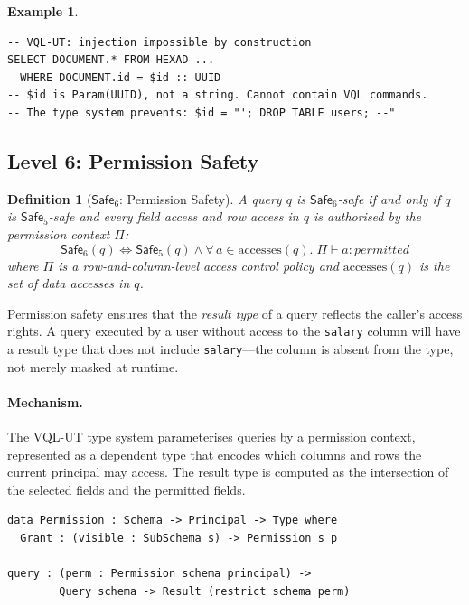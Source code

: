 \documentclass[11pt,a4paper]{article}
\newtheorem{definition}[theorem]{Definition}
\newtheorem{example}[theorem]{Example}
\newcommand{\VQL}{\textsc{VQL-UT}}
\newcommand{\Safe}[1]{\ensuremath{\mathsf{Safe}_{#1}}}
\begin{document}
\begin{example}
\begin{lstlisting}[language=VQL]
-- VQL-UT: injection impossible by construction
SELECT DOCUMENT.* FROM HEXAD ...
  WHERE DOCUMENT.id = $id :: UUID
-- $id is Param(UUID), not a string. Cannot contain VQL commands.
-- The type system prevents: $id = "'; DROP TABLE users; --"
\end{lstlisting}
\end{example}

\subsection{Level 6: Permission Safety}\label{sec:L6}

\begin{definition}[\Safe{6}: Permission Safety]
A query $q$ is \Safe{6}-safe if and only if $q$ is \Safe{5}-safe and
every field access and row access in $q$ is authorised by the
permission context $\Pi$:
\[
  \Safe{6}(q) \iff \Safe{5}(q) \land
  \forall\, a \in \mathrm{accesses}(q).\;
  \Pi \vdash a : \mathit{permitted}
\]
where $\Pi$ is a row-and-column-level access control policy and
$\mathrm{accesses}(q)$ is the set of data accesses in $q$.
\end{definition}

Permission safety ensures that the \emph{result type} of a query
reflects the caller's access rights.  A query executed by a user
without access to the \texttt{salary} column will have a result type
that does not include \texttt{salary}---the column is absent from the
type, not merely masked at runtime.

\paragraph{Mechanism.}
The \VQL{} type system parameterises queries by a permission context,
represented as a dependent type that encodes which columns and rows the
current principal may access.  The result type is computed as the
intersection of the selected fields and the permitted fields.

\begin{lstlisting}[language=Idris2]
data Permission : Schema -> Principal -> Type where
  Grant : (visible : SubSchema s) -> Permission s p

query : (perm : Permission schema principal) ->
        Query schema -> Result (restrict schema perm)
\end{lstlisting}
\end{document}
